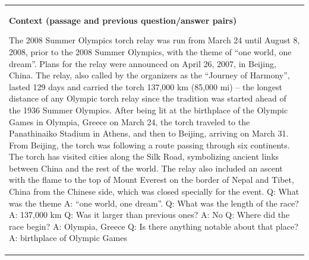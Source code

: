 \documentclass{article}
\begin{document}
\begin{table}[t]
\begin{center}
\begin{tabular}{|p{16cm}|}
\hline
\newline\vspace{3}
\textbf{Context (passage and previous question/answer pairs)} \newline

The 2008 Summer Olympics torch relay was run from March 24 until August 8, 2008, prior to the 2008 Summer Olympics, with the theme of “one world, one dream”. Plans for the relay were announced on April 26, 2007, in Beijing, China. The relay, also called by the organizers as the “Journey of Harmony”, lasted 129 days and carried the torch 137,000 km (85,000 mi) – the longest distance of any Olympic torch relay since the tradition was started ahead of the 1936 Summer Olympics.
\newline\newline
After being lit at the birthplace of the Olympic Games in Olympia, Greece on March 24, the torch traveled to the Panathinaiko Stadium in Athens, and then to Beijing, arriving on March 31. From Beijing, the torch was following a route passing through six continents. The torch has visited cities along the Silk Road, symbolizing ancient links between China and the rest of the world. The relay also included an ascent with the flame to the top of Mount Everest on the border of Nepal and Tibet, China from the Chinese side, which was closed specially for the event.
\newline\newline
Q: What was the theme
\newline
A: “one world, one dream”.
\newline\newline
Q: What was the length of the race?
\newline
A: 137,000 km
\newline\newline
Q: Was it larger than previous ones?
\newline
A: No
\newline\newline
Q: Where did the race begin?
\newline
A: Olympia, Greece
\newline\newline
Q: Is there anything notable about that place?
\newline
A: birthplace of Olympic Games
\newline\newline

\end{tabular}
\end{center}
\end{table}
\end{document}
